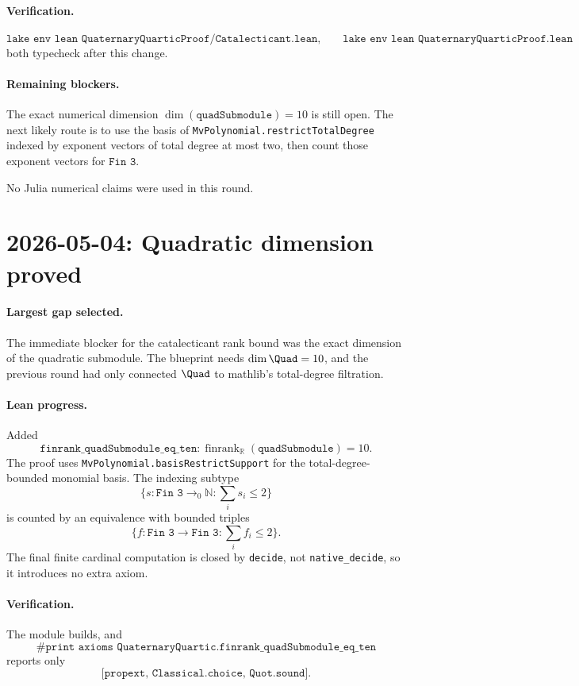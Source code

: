 \documentclass[11pt]{article}
\begin{document}
\paragraph{Verification.}
\[
\texttt{lake env lean QuaternaryQuarticProof/Catalecticant.lean},\qquad
\texttt{lake env lean QuaternaryQuarticProof.lean}
\]
both typecheck after this change.

\paragraph{Remaining blockers.}
The exact numerical dimension \(\dim(\texttt{quadSubmodule})=10\) is still
open.  The next likely route is to use the basis of
\texttt{MvPolynomial.restrictTotalDegree} indexed by exponent vectors of total
degree at most two, then count those exponent vectors for \(\texttt{Fin 3}\).

No Julia numerical claims were used in this round.

\section*{2026-05-04: Quadratic dimension proved}

\paragraph{Largest gap selected.}
The immediate blocker for the catalecticant rank bound was the exact dimension
of the quadratic submodule.  The blueprint needs
\(\dim \Quad=10\), and the previous round had only connected \(\Quad\) to
mathlib's total-degree filtration.

\paragraph{Lean progress.}
Added
\[
\texttt{finrank\_quadSubmodule\_eq\_ten} :
  \operatorname{finrank}_{\mathbb R}(\texttt{quadSubmodule})=10.
\]
The proof uses \texttt{MvPolynomial.basisRestrictSupport} for the
total-degree-bounded monomial basis.  The indexing subtype
\[
\{s:\texttt{Fin 3}\to_0\mathbb N : \sum_i s_i\le2\}
\]
is counted by an equivalence with bounded triples
\[
\{f:\texttt{Fin 3}\to\texttt{Fin 3} : \sum_i f_i\le2\}.
\]
The final finite cardinal computation is closed by \texttt{decide}, not
\texttt{native\_decide}, so it introduces no extra axiom.

\paragraph{Verification.}
The module builds, and
\[
\texttt{\#print axioms QuaternaryQuartic.finrank\_quadSubmodule\_eq\_ten}
\]
reports only
\[
\texttt{[propext, Classical.choice, Quot.sound]}.
\]
\end{document}
